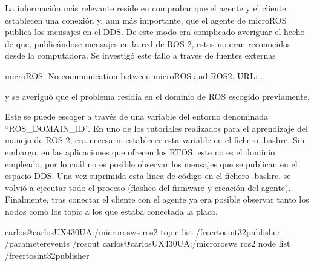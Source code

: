 \documentclass[a4paper,11pt,spanish]{sphinxmanual}
\begin{document}
\sphinxAtStartPar
La información más relevante reside en comprobar que el agente y el cliente
establecen una conexión y, aun más importante, que el agente de micro\sphinxhyphen{}ROS
publica los mensajes en el DDS. De este modo era complicado averiguar el hecho
de que, publicándose mensajes en la red de ROS 2, estos no eran reconocidos
desde la computadora. Se investigó este fallo a través de fuentes externas
%
\begin{footnote}[2]\sphinxAtStartFootnote
micro\sphinxhyphen{}ROS. No communication between micro\sphinxhyphen{}ROS and ROS2. URL: .
%
\end{footnote} y se averiguó que
el problema residía en el dominio de ROS escogido previamente.

\sphinxAtStartPar
Este se puede escoger a través de una variable del entorno denominada
“ROS\_DOMAIN\_ID”. En uno de los tutoriales realizados para el aprendizaje
del manejo de ROS 2, era necesario establecer esta variable en el
fichero .bashrc. Sin embargo, en las aplicaciones que ofrecen los RTOS,
este no es el dominio empleado, por lo cuál no es posible observar los
mensajes que se publican en el espacio DDS. Una vez suprimida esta línea
de código en el fichero .bashrc, se volvió a ejecutar todo el proceso
(flasheo del firmware y creación del agente). Finalmente, tras conectar
el cliente con el agente ya era posible observar tanto los nodos como los
topic a los que estaba conectada la placa.

\begin{sphinxVerbatim}[commandchars=\\\{\},formatcom=\footnotesize]
carlos@carlos\PYGZhy{}UX430UA:\PYGZti{}/microros\PYGZus{}ws\PYGZdl{} ros2 topic list
/freertos\PYGZus{}int32\PYGZus{}publisher
/parameter\PYGZus{}events
/rosout
carlos@carlos\PYGZhy{}UX430UA:\PYGZti{}/microros\PYGZus{}ws\PYGZdl{} ros2 node list
/freertos\PYGZus{}int32\PYGZus{}publisher
\end{sphinxVerbatim}

\sphinxAtStartPar


\renewcommand{\listtablename}{Índice de tablas}
\listoffigures
\end{document}
